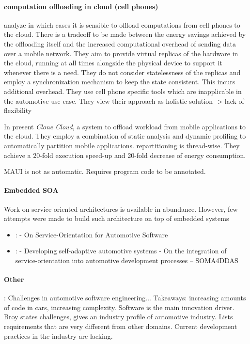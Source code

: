 \paragraph{computation offloading in cloud (cell phones)}
\citeauthor*{barbera2013offload} \cite{barbera2013offload} analyze in which cases it is sensible to offload computations from cell phones to the cloud. There is a tradeoff to be made between the energy savings achieved by the offloading itself and the increased computational overhead of sending data over a mobile network. They aim to provide virtual replicas of the hardware in the cloud, running at all times alongside the physical device to support it whenever there is a need. They do not consider statelessness of the replicas and employ a synchronization mechanism to keep the state consistent. This incurs additional overhead. They use cell phone specific tools which are inapplicable in the automotive use case. They view their approach as holistic solution -> lack of flexibility

In \cite{chun2011clonecloud} \citeauthor*{barbera2013offload} present \emph{Clone Cloud}, a system to offload workload from mobile applications to the cloud. They employ a combination of static analysis and dynamic profiling to automatically partition mobile applications. repartitioning is thread-wise. They achieve a 20-fold execution speed-up and 20-fold decrease of energy consumption.

MAUI is not as automatic. Requires program code to be annotated.


\paragraph{Embedded SOA}
Work on service-oriented architectures is available in abundance. However, few attempts were made to build such architecture on top of embedded systems

\begin{itemize}
\item \cite{kugele2017service}: \citeauthor*{kugele2017service} - On Service-Orientation for Automotive Software
\item \cite{wagner2014developing}: \citeauthor*{wagner2014developing} - Developing self-adaptive automotive systems - On the integration of service-orientation into automotive
development processes -- SOMA4DDAS
\end{itemize}





\paragraph{Other}
\citeauthor*{broy2006challenges} \cite{broy2006challenges}: Challenges in automotive software engineering... Takeaways: increasing amounts of code in cars, increasing complexity. Software is the main innovation driver. Broy states challenges, gives an industry profile of automotive industry. Lists requirements that are very different from other domains. Current development practices in the industry are lacking.
